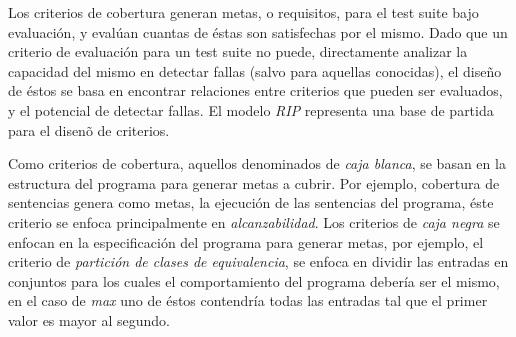 Los criterios de cobertura generan metas, o requisitos, para el test suite bajo evaluaci\'on, y eval\'uan cuantas de \'estas son satisfechas por el mismo. Dado que un criterio de evaluaci\'on para un test suite no puede, directamente analizar la capacidad del mismo en detectar fallas (salvo para aquellas conocidas), el dise\~no de \'estos se basa en encontrar relaciones entre criterios que pueden ser evaluados, y el potencial de detectar fallas. El modelo \emph{RIP} representa una base de partida para el disen\~o de criterios.

Como criterios de cobertura, aquellos denominados de \emph{caja blanca}, se basan en la estructura del programa para generar metas a cubrir. Por ejemplo, cobertura de sentencias genera como metas, la ejecuci\'on de las sentencias del programa, \'este criterio se enfoca principalmente en \emph{alcanzabilidad}. Los criterios de \emph{caja negra} se enfocan en la especificaci\'on del programa para generar metas, por ejemplo, el criterio de \emph{partici\'on de clases de equivalencia}, se enfoca en dividir las entradas en conjuntos para los cuales el comportamiento del programa deber\'ia ser el mismo, en el caso de \emph{max} uno de \'estos contendr\'ia todas las entradas tal que el primer valor es mayor al segundo.